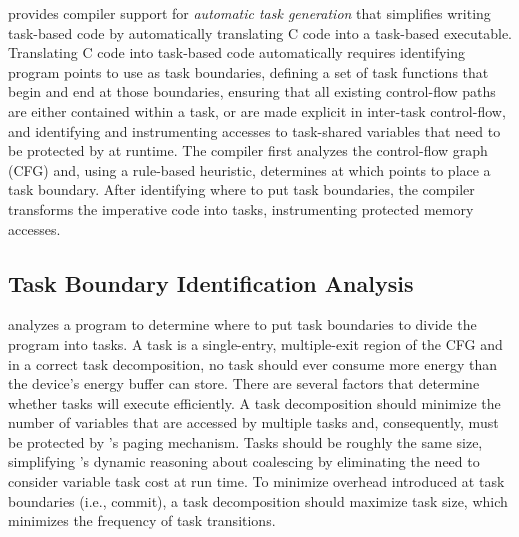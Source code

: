 \sys provides compiler support for \emph{automatic task generation} that simplifies writing task-based code by automatically translating C code into a task-based executable.  Translating C code into task-based code automatically requires identifying program points to use as task boundaries, defining a set of task functions that begin and end at those boundaries, ensuring that all existing control-flow paths are either contained within a task, or are made explicit in inter-task control-flow, and identifying and instrumenting accesses to task-shared variables that need to be protected by \sys at runtime. The \sys compiler first analyzes the control-flow graph (CFG) and, using a rule-based heuristic, determines at which points to place a task boundary. After identifying where to put task boundaries, the \sys compiler transforms the imperative code into tasks, instrumenting protected memory accesses. 

\subsection{Task Boundary Identification Analysis}
\label{sec:compiler_analysis_pass}

\sys analyzes a program to determine where to put task boundaries to divide the program into tasks. A task is a single-entry, multiple-exit region of the CFG and in a correct task decomposition, no task should ever consume more energy than the device's energy buffer can store. There are several factors that determine whether tasks will execute efficiently. A task decomposition should minimize the number of variables that are accessed by multiple tasks and, consequently, must be protected by \sys's paging mechanism. Tasks should be roughly the same size, simplifying \sys's dynamic reasoning about coalescing by eliminating the need to consider variable task cost at run time. To minimize overhead introduced at task boundaries (i.e., commit), a task decomposition should maximize task size, which minimizes the frequency of task transitions.

%
%

